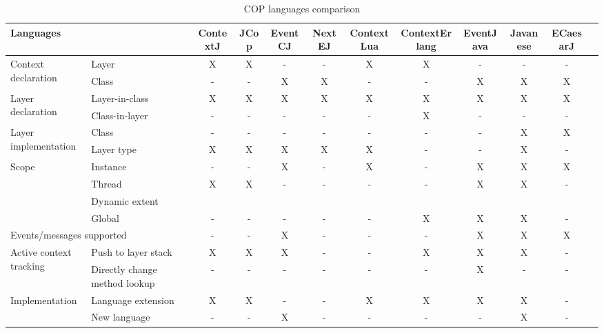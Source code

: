 \documentclass[a4paper]{article}
\begin{document}
\begin{landscape}
  \begin{table}
  \begin{adjustbox}{center}
  \begin{tabular}{l p{3cm} c c c c c c c c c c}
  \hline
  \multicolumn{2}{l}{Languages} & ContextJ & JCop & EventCJ & NextEJ & ContextLua & ContextErlang & EventJava & Javanese & ECaesarJ \\

  \hline
  \multirow{2}{*}{Context declaration}
    & Layer &   X & X & - & - & X & X & - & - & - \\
    & Class &   - & - & X & X & - & - & X & X & X \\

  \hline  
  \multirow{2}{*}{Layer declaration}
    & Layer-in-class &   X & X & X & X & X & X & X & X & X \\
    & Class-in-layer &   - & - & - & - & - & X & - & - & - \\

  \hline
  \multirow{2}{*}{Layer implementation}
    & Class &       - & - & - & - & - & - & - & X & X \\
    & Layer type &  X & X & X & X & X & - & - & X & - \\    

  \hline  
  \multirow{3}{*}{Scope}
    & Instance &        - & - & X & - & X & - & X & X & X \\
    & Thread &          X & X & - & - & - & - & X & X & - \\
    & Dynamic extent &    &   &   &   &   &   &   &   &   \\
    & Global &          - & - & - & - & - & X & X & X & - \\

  \hline
  \multicolumn{2}{l}{Events/messages supported}
    & - & - & X & - & - & - & X & X & X \\

  \hline
  \multirow{2}{*}{Active context tracking}
    & Push to layer stack &             X & X & X & - & - & X & X & X & - \\
    & Directly change method lookup &   - & - & - & - & - & - & X & - & - \\

  \hline    
  \multirow{3}{*}{Implementation}
    & Language extension &   X & X & - & - & X & X & X & X & - \\
    & New language &         - & - & X & - & - & - & - & X & - \\

  \end{tabular}
  \end{adjustbox}
  \caption{COP languages comparison}
  \label{table:coplanguages}

  \end{table}
\end{landscape}
\end{document}

